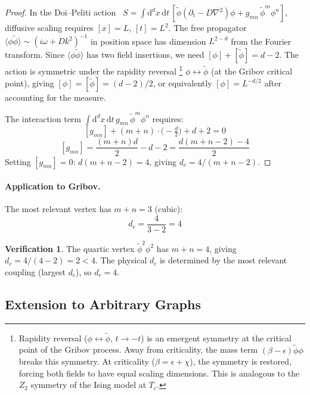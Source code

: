 \documentclass[11pt,a4paper]{article}
\theoremstyle{definition}
\newtheorem*{verification}{Verification}
\newcommand{\dd}{\mathrm{d}}
\newcommand{\phit}{\tilde{\phi}}
\begin{document}
\begin{proof}
In the Doi--Peliti action~\cite{tauber2005}
$S = \int \dd^d x\, \dd t\,[\phit(\partial_t - D\nabla^2)\phi
+ g_{mn}\, \phit^m \phi^n]$,
diffusive scaling requires $[x] = L$, $[t] = L^2$. The free propagator
$\langle \phi\phit \rangle \sim (i\omega + Dk^2)^{-1}$ in position space
has dimension $L^{2-d}$ from the Fourier transform. Since
$\langle \phi \phit \rangle$ has two field insertions, we need
$[\phi] + [\phit] = d - 2$. The action is symmetric under the
rapidity reversal%
\footnote{Rapidity reversal ($\phi \leftrightarrow \phit$, $t \to -t$)
is an emergent symmetry at the critical point of the Gribov process.
Away from criticality, the mass term $(\beta - \epsilon)\phit\phi$ breaks
this symmetry. At criticality ($\beta = \epsilon + \chi$), the symmetry
is restored, forcing both fields to have equal scaling dimensions.
This is analogous to the $Z_2$ symmetry of the Ising model at $T_c$.}
$\phi \leftrightarrow \phit$
(at the Gribov critical point), giving $[\phi] = [\phit] = (d-2)/2$,
or equivalently $[\phi] = L^{-d/2}$ after accounting for the measure.

The interaction term $\int \dd^d x\, \dd t\, g_{mn}\, \phit^m \phi^n$
requires:
\[
[g_{mn}] + (m+n) \cdot \bigl(-\tfrac{d}{2}\bigr) + d + 2 = 0
\]
\[
[g_{mn}] = \frac{(m+n)d}{2} - d - 2 = \frac{d(m+n-2) - 4}{2}
\]
Setting $[g_{mn}] = 0$: $d(m+n-2) = 4$, giving $d_c = 4/(m+n-2)$.
\end{proof}

\paragraph{Application to Gribov.}
The most relevant vertex has $m + n = 3$ (cubic):
\begin{equation}
\boxed{d_c = \frac{4}{3 - 2} = 4}
\end{equation}

\begin{verification}
The quartic vertex $\phit^2\phi^2$ has $m+n=4$, giving $d_c = 4/(4-2) = 2 < 4$.
The physical $d_c$ is determined by the most relevant coupling (largest $d_c$),
so $d_c = 4$. \checkmark
\end{verification}

\subsection{Extension to Arbitrary Graphs}
\end{document}
